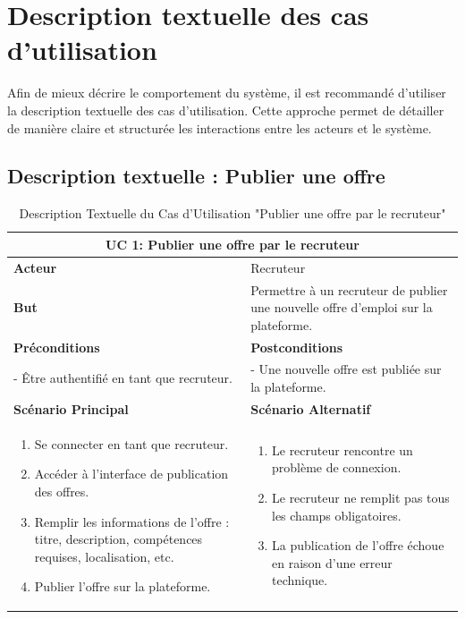 \section{Description textuelle des cas d'utilisation}

Afin de mieux décrire le comportement du système, il est recommandé 
d'utiliser la description textuelle des cas d’utilisation. 
Cette approche permet de détailler de manière claire et structurée 
les interactions entre les acteurs et le système.

\subsection{Description textuelle : Publier une offre}
\begin{minipage}{\textwidth}
    \begin{table}[H]
    \centering
    \caption{Description Textuelle du Cas d'Utilisation "Publier une offre par le recruteur"}
    \begin{tabular}{| m{8cm} | m{8cm} |}
    \hline
    \multicolumn{2}{|c|}{\textbf{UC 1:} Publier une offre par le recruteur} \\ \hline
    \textbf{Acteur} & Recruteur \\ \hline
    \textbf{But} & Permettre à un recruteur de publier une nouvelle offre d'emploi sur la plateforme. \\ \hline
    \textbf{Préconditions} & \textbf{Postconditions} \\ \hline
    - Être authentifié en tant que recruteur. & - Une nouvelle offre est publiée sur la plateforme. \\ \hline
    \textbf{Scénario Principal} & \textbf{Scénario Alternatif} \\ \hline
    \begin{enumerate}
        \item Se connecter en tant que recruteur.
        \item Accéder à l'interface de publication des offres.
        \item Remplir les informations de l'offre : titre, description, compétences requises, localisation, etc.
        \item Publier l'offre sur la plateforme.
    \end{enumerate} & 
    \begin{enumerate}
        \item Le recruteur rencontre un problème de connexion.
        \item Le recruteur ne remplit pas tous les champs obligatoires.
        \item La publication de l'offre échoue en raison d'une erreur technique.
    \end{enumerate} \\ \hline
    \end{tabular}
    \label{tab:UCPublier_Offre}
    \end{table}
\end{minipage}

